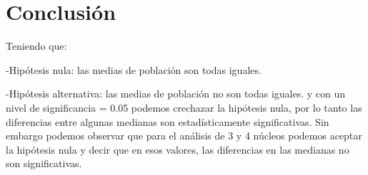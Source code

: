 \documentclass{article}
\begin{document}
\section{Conclusi\'on}
Teniendo que:

-Hip\'otesis nula: las medias de poblaci\'on son todas iguales.

-Hip\'otesis alternativa: las medias de poblaci\'on no son todas iguales.
y con un nivel de significancia = 0.05 podemos crechazar la hip\'otesis nula, por lo tanto las diferencias entre algunas medianas son estad\'isticamente significativas. Sin embargo podemos observar que para el an\'alisis de 3 y 4 n\'ucleos podemos aceptar la hip\'otesis nula y decir que en esos valores, las diferencias en las medianas no son significativas.



\end{document}
